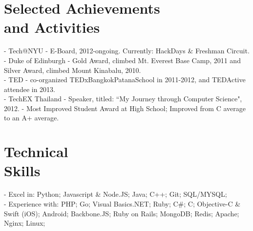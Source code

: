 \documentclass[margin]{res}
\begin{document}
\begin{resume}
\section{Selected Achievements \\ and Activities} 
- Tech@NYU - E-Board, 2012-ongoing. Currently: HackDays \& Freshman Circuit. \\
- Duke of Edinburgh - Gold Award, climbed Mt. Everest Base Camp, 2011 and Silver Award, climbed Mount Kinabalu, 2010. \\
- TED - co-organized TEDxBangkokPatanaSchool in 2011-2012, and TEDActive attendee in 2013. \\
- TechEX Thailand - Speaker, titled: ``My Journey through Computer Science", 2012.
- Most Improved Student Award at High School; Improved from C average to an A+ average.

\section{Technical \\ Skills}
- Excel in: Python; Javascript \& Node.JS; Java;  C++; Git; SQL/MYSQL; \\
- Experience with: PHP; Go; Visual Basics.NET; Ruby; C\#; C; Objective-C \& Swift (iOS); Android; Backbone.JS; Ruby on Rails; MongoDB; Redis; Apache; Nginx; Linux;

\end{resume} 
\end{document}
